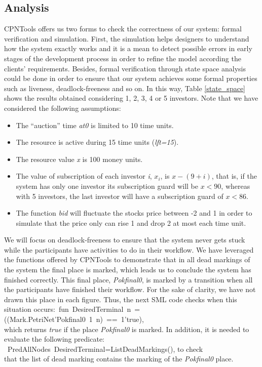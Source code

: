 \subsection{Analysis}\label{analysis}
CPNTools offers us two forms to check the correctness of our system: formal verification and simulation. 
First, the simulation helps designers to understand how the system exactly works and it is a mean to
detect possible errors in early stages of the development process in order to refine the model according the
clients' requirements. Besides, formal verification through state space
analysis could be done in order to ensure that our system achieves some formal properties such as liveness, deadlock-freeness and so on.
In this way, Table \ref{state_space} shows the
results obtained considering 1, 2, 3, 4 or 5 investors. Note that we have considered the following assumptions:

\begin{itemize}
 \item The ``auction'' time {\em at0} is limited to 10 time units.
 \item The resource is active during 15 time units ({\em lft=15}).
 \item The resource value {\em x} is 100 money units.
 \item The value of subscription of each investor {\em i}, {\em $x_i$}, is $x-(9+i)$, that is, if the system has only one investor its subscription guard will be $x<90$, whereas with 5 investors, the last investor will have a subscription guard of $x<86$.
 \item The function {\it bid} will fluctuate the stocks price between -2 and 1 in order to simulate that the price only can rise 1 and drop 2 at most each time unit. 
\end{itemize}
We will focus on deadlock-freeness to ensure that the
system never gets stuck while the participants have activities to do
in their workflow. We have leveraged the functions offered by CPNTools
to demonstrate that in all dead markings of the system the final
place is marked, which leads us to conclude the system has finished
correctly. This final place, {\em Pokfinal0}, is marked by a transition when all the participants have finished their workflow. For the sake of clarity, we have not drawn this place in each figure. Thus, the next SML code checks when this situation
occurs:\ \mbox{{\small{fun DesiredTerminal n =((Mark.PetriNet'Pokfinal0
1 n) ==
1'true)}}}, \\
which returns {\em true} if the place {\it Pokfinal0} is marked. In
addition, it is needed to evaluate the following predicate:
\mbox{{\small{  PredAllNodes
DesiredTerminal=ListDeadMarkings()}}}, to check \\that the list of
dead marking contains the marking of the {\em Pokfinal0} place.

